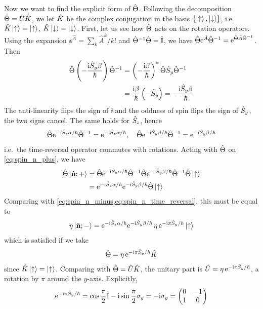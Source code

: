Now we want to find the explicit form of $\hat{\Theta}$. Following the decomposition $\hat{\Theta} = \hat{U} \hat{K}$, we let $\hat{K}$ be the complex conjugation in the basis $\{\ket{\uparrow}, \ket{\downarrow}\}$, i.e.\ $\hat{K} \ket{\uparrow} = \ket{\uparrow}$, $\hat{K} \ket{\downarrow} = \ket{\downarrow}$. First, let us see how $\hat{\Theta}$ acts on the rotation operators. Using the expansion $\ee^{\hat{A}} = \sum_k \hat{A}^k / k!$ and $\hat{\Theta}^{-1} \hat{\Theta} = \hat{\mathbb{I}}$, we have $\hat{\Theta} \mathrm{e}^{\hat{A}} \hat{\Theta}^{-1} = \mathrm{e}^{\hat{\Theta} \hat{A} \hat{\Theta}^{-1}}$. Then
\begin{align*}
    \hat{\Theta} \left( - \frac{\mathrm{i} \hat{S}_y \beta}{\hbar} \right) \hat{\Theta}^{-1} &= \left( - \frac{\mathrm{i} \beta}{\hbar}\right)^* \hat{\Theta} \hat{S}_y \hat{\Theta}^{-1} \\
    &= \frac{\mathrm{i} \beta}{\hbar} \left( - \hat{S}_y \right) = - \frac{\mathrm{i} \hat{S}_y \beta}{\hbar}
\end{align*}
The anti-linearity flips the sign of $\ii$ and the oddness of spin flips the sign of $\hat{S}_y$, the two signs cancel. The same holds for $\hat{S}_z$, hence
\begin{align*}
    \hat{\Theta} \mathrm{e}^{-\mathrm{i} \hat{S}_z \alpha / \hbar} \hat{\Theta}^{-1} = \mathrm{e}^{-\mathrm{i} \hat{S}_z \alpha / \hbar}, \quad \hat{\Theta} \mathrm{e}^{-\mathrm{i} \hat{S}_y \beta / \hbar} \hat{\Theta}^{-1} = \mathrm{e}^{-\mathrm{i} \hat{S}_y \beta / \hbar}
\end{align*}
i.e.\ the time-reversal operator commutes with rotations. Acting with $\hat{\Theta}$ on \cref{eq:spin_n_plus}, we have
\begin{align*}
    \hat{\Theta} \ket{\hat{\mathbf{n}};+} &= \hat{\Theta} \mathrm{e}^{-\mathrm{i} \hat{S}_z \alpha / \hbar} \hat{\Theta}^{-1} \hat{\Theta} \mathrm{e}^{-\mathrm{i} \hat{S}_y \beta / \hbar} \hat{\Theta}^{-1} \hat{\Theta} \ket{\uparrow} \\
    &= \mathrm{e}^{-\mathrm{i} \hat{S}_z \alpha / \hbar} \mathrm{e}^{-\mathrm{i} \hat{S}_y \beta / \hbar} \hat{\Theta} \ket{\uparrow}
\end{align*}
Comparing with \cref{eq:spin_n_minus,eq:spin_n_time_reversal}, this must be equal to
\begin{align*}
    \eta \ket{\hat{\mathbf{n}};-} = \mathrm{e}^{-\mathrm{i} \hat{S}_z \alpha / \hbar} \mathrm{e}^{-\mathrm{i} \hat{S}_y \beta / \hbar} \, \eta \, \mathrm{e}^{-\mathrm{i} \pi \hat{S}_y / \hbar} \ket{\uparrow}
\end{align*}
which is satisfied if we take
\begin{align}
    \hat{\Theta} = \eta \, \mathrm{e}^{-\mathrm{i} \pi \hat{S}_y / \hbar} \hat{K} \label{eq:time_reversal_spin_half}
\end{align}
since $\hat{K} \ket{\uparrow} = \ket{\uparrow}$. Comparing with $\hat{\Theta} = \hat{U} \hat{K}$, the unitary part is $\hat{U} = \eta \, \mathrm{e}^{-\mathrm{i} \pi \hat{S}_y / \hbar}$, a rotation by $\pi$ around the $y$-axis. Explicitly,
\begin{align*}
    \mathrm{e}^{-\mathrm{i} \pi \hat{S}_y / \hbar} = \cos\frac{\pi}{2} \hat{\mathbb{I}} - \mathrm{i} \sin\frac{\pi}{2} \sigma_y = - \mathrm{i} \sigma_y = \begin{pmatrix} 0 & -1 \\ 1 & 0 \end{pmatrix}
\end{align*}
